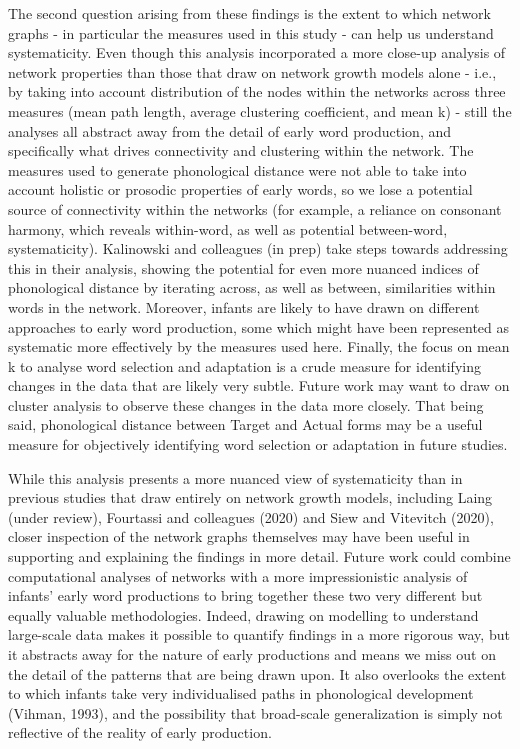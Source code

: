 \documentclass[
  man]{apa6}
\begin{document}
The second question arising from these findings is the extent to which network graphs - in particular the measures used in this study - can help us understand systematicity. Even though this analysis incorporated a more close-up analysis of network properties than those that draw on network growth models alone - i.e., by taking into account distribution of the nodes within the networks across three measures (mean path length, average clustering coefficient, and mean k) - still the analyses all abstract away from the detail of early word production, and specifically what drives connectivity and clustering within the network. The measures used to generate phonological distance were not able to take into account holistic or prosodic properties of early words, so we lose a potential source of connectivity within the networks (for example, a reliance on consonant harmony, which reveals within-word, as well as potential between-word, systematicity). Kalinowski and colleagues (in prep) take steps towards addressing this in their analysis, showing the potential for even more nuanced indices of phonological distance by iterating across, as well as between, similarities within words in the network. Moreover, infants are likely to have drawn on different approaches to early word production, some which might have been represented as systematic more effectively by the measures used here. Finally, the focus on mean k to analyse word selection and adaptation is a crude measure for identifying changes in the data that are likely very subtle. Future work may want to draw on cluster analysis to observe these changes in the data more closely. That being said, phonological distance between Target and Actual forms may be a useful measure for objectively identifying word selection or adaptation in future studies.

While this analysis presents a more nuanced view of systematicity than in previous studies that draw entirely on network growth models, including Laing (under review), Fourtassi and colleagues (2020) and Siew and Vitevitch (2020), closer inspection of the network graphs themselves may have been useful in supporting and explaining the findings in more detail. Future work could combine computational analyses of networks with a more impressionistic analysis of infants' early word productions to bring together these two very different but equally valuable methodologies. Indeed, drawing on modelling to understand large-scale data makes it possible to quantify findings in a more rigorous way, but it abstracts away for the nature of early productions and means we miss out on the detail of the patterns that are being drawn upon. It also overlooks the extent to which infants take very individualised paths in phonological development (Vihman, 1993), and the possibility that broad-scale generalization is simply not reflective of the reality of early production.
\end{document}
